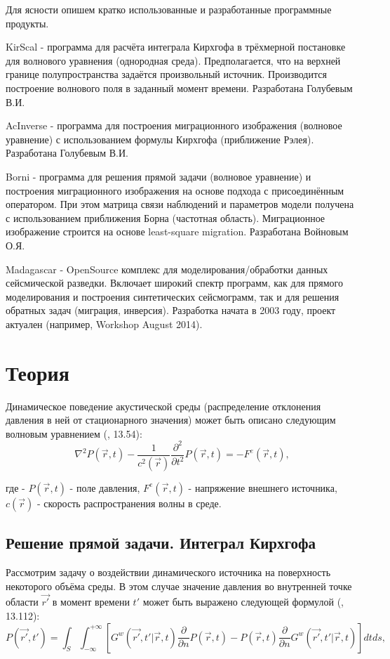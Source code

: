 \documentclass{article}
\begin{document}
Для ясности опишем кратко использованные и разработанные программные продукты.

KirScal - программа для расчёта интеграла Кирхгофа в трёхмерной постановке для волнового уравнения (однородная среда). Предполагается, что на верхней границе полупространства задаётся произвольный источник. Производится построение волнового поля в заданный момент времени. Разработана Голубевым В.И.

AcInverse - программа для построения миграционного изображения (волновое уравнение) с использованием формулы Кирхгофа (приближение Рэлея).
Разработана Голубевым В.И.

Borni - программа для решения прямой задачи (волновое уравнение) и построения миграционного изображения на основе подхода с присоединённым оператором.
При этом матрица связи наблюдений и параметров модели получена с использованием приближения Борна (частотная область).
Миграционное изображение строится на основе least-square migration.
Разработана Войновым О.Я.

Madagascar - OpenSource комплекс для моделирования/обработки данных сейсмической разведки.
Включает широкий спектр программ, как для прямого моделирования и построения синтетических сейсмограмм, так и для решения обратных задач (миграция, инверсия).
Разработка начата в 2003 году, проект актуален (например, Workshop August 2014).

\section{Теория}

Динамическое поведение акустической среды (распределение отклонения давления в ней от стационарного значения)
может быть описано следующим волновым уравнением (\cite{Zhdanov_2007}, 13.54):
\begin{equation}
\label{wave_equation}
\nabla^2P(\vec{r},t) - \frac{1}{c^2(\vec{r})}\frac{\partial^2}{\partial t^2}
	P(\vec{r},t) = - F^e(\vec{r},t),
\end{equation}

где - $P(\vec{r},t)$ - поле давления, $F^e(\vec{r},t)$ - напряжение внешнего источника, $c(\vec{r})$
- скорость распространения волны в среде.

\subsection{Решение прямой задачи. Интеграл Кирхгофа}

Рассмотрим задачу о воздействии динамического источника на поверхность некоторого объёма среды.
В этом случае значение давления во внутренней точке области $\vec{r'}$ в момент времени $t'$ может быть выражено следующей формулой (\cite{Zhdanov_2007}, 13.112):
\begin{equation}
\label{eq_kirchhoff_common}
P(\vec{r'}, t') = \int_S \int_{-\infty}^{+\infty} [G^w(\vec{r'}, t' | \vec{r}, t) \frac{\partial}
{\partial n} P(\vec{r}, t) - P(\vec{r}, t) \frac{\partial}{\partial n} G^w(\vec{r'}, t' |
\vec{r}, t)] dt ds,
\end{equation}
\end{document}

